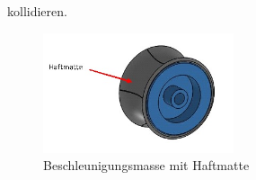     kollidieren. 
    \begin{figure}[h!]
       	\includegraphics[width=0.5\textwidth,clip,trim=0mm 0mm 0mm 0mm]
       	{Enddokumentation/Bilder/Beschleunigungsrad.JPG}
       	\centering
       	\caption{Beschleunigungsmasse mit Haftmatte}
       	\label{abb:BeschleunigungsmasseHaft}
    \end{figure}
    
